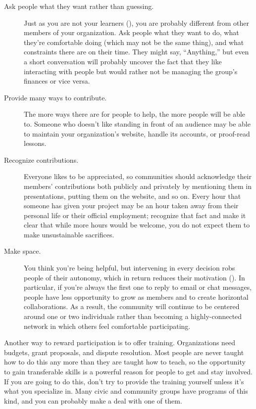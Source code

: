 \begin{description}

\item[Ask people what they want rather than guessing.]
  Just as you are not your learners (),
  you are probably different from other members of your organization.
  Ask people what they want to do,
  what they're comfortable doing (which may not be the same thing),
  and what constraints there are on their time.
  They might say, ``Anything,''
  but even a short conversation will probably uncover the fact that
  they like interacting with people but would rather not be managing the group's finances
  or vice versa.

\item[Provide many ways to contribute.]
  The more ways there are for people to help,
  the more people will be able to.
  Someone who doesn't like standing in front of an audience
  may be able to maintain your organization's website,
  handle its accounts,
  or proof-read lessons.

\item[Recognize contributions.]
  Everyone likes to be appreciated,
  so communities should acknowledge
  their members' contributions both publicly and privately
  by mentioning them in presentations,
  putting them on the website,
  and so on.
  Every hour that someone has given your project
  may be an hour taken away from their personal life or their official employment;
  recognize that fact
  and make it clear that while more hours would be welcome,
  you do not expect them to make unsustainable sacrifices.

\item[Make space.]
  You think you're being helpful,
  but intervening in every decision robs people of their autonomy,
  which in return reduces their motivation ().
  In particular,
  if you're always the first one to reply to email or chat messages,
  people have less opportunity to grow as members
  and to create horizontal collaborations.
  As a result,
  the community will continue to be centered around one or two individuals
  rather than becoming a highly-connected network
  in which others feel comfortable participating.

\end{description}

Another way to reward participation is to offer training.
Organizations need budgets, grant proposals, and dispute resolution.
Most people are never taught how to do this any more than they are taught how to teach,
so the opportunity to gain transferable skills
is a powerful reason for people to get and stay involved.
If you are going to do this,
don't try to provide the training yourself
unless it's what you specialize in.
Many civic and community groups have programs of this kind,
and you can probably make a deal with one of them.

